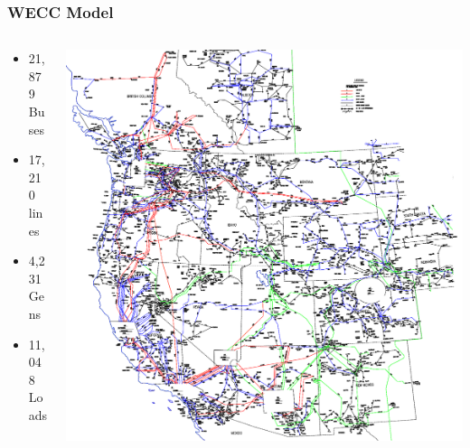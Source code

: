 \documentclass[14pt, unknownkeysallowed]{beamer}
\begin{document}
\begin{frame}
\frametitle{WECC Model}
\begin{columns}
\begin{column}{0.45\textwidth}
   \begin{itemize}
\item 21,879 Buses
\item 17,210 lines
\item 4,231 Gens
\item 11,048 Loads
\end{itemize}
\end{column}
\begin{column}{0.5\textwidth}
\includegraphics[height=.8\textheight]{WECCauto} %
\end{column}
\end{columns}
\end{frame}

\end{document}
